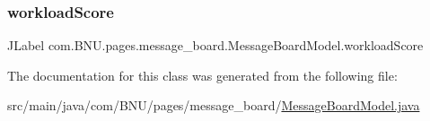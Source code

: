 \subsubsection{\texorpdfstring{workload\+Score}{workloadScore}}
{\footnotesize\ttfamily J\+Label com.\+B\+N\+U.\+pages.\+message\+\_\+board.\+Message\+Board\+Model.\+workload\+Score\hspace{0.3cm}{\ttfamily [private]}}



The documentation for this class was generated from the following file\+:\begin{DoxyCompactItemize}
\item 
src/main/java/com/\+B\+N\+U/pages/message\+\_\+board/\mbox{\hyperlink{_message_board_model_8java}{Message\+Board\+Model.\+java}}\end{DoxyCompactItemize}
